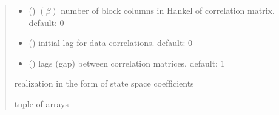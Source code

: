 \documentclass[letterpaper,10pt,english]{sphinxmanual}
\begin{document}
\begin{fulllineitems}
\begin{quote}
\begin{description}
\begin{itemize}
\item {} 
\sphinxAtStartPar
{} (\sphinxstyleliteralemphasis{\sphinxupquote{, }}) \textendash{} \((\beta)\) number of block columns in Hankel of correlation matrix. default: 0

\item {} 
\sphinxAtStartPar
{} (\sphinxstyleliteralemphasis{\sphinxupquote{, }}) \textendash{} initial lag for data correlations. default: 0

\item {} 
\sphinxAtStartPar
{} (\sphinxstyleliteralemphasis{\sphinxupquote{, }}) \textendash{} lags (gap) between correlation matrices. default: 1

\end{itemize}

\sphinxAtStartPar
realization in the form of state space coefficients 

\sphinxAtStartPar
tuple of arrays

\end{description}\end{quote}

\end{fulllineitems}

\end{document}
